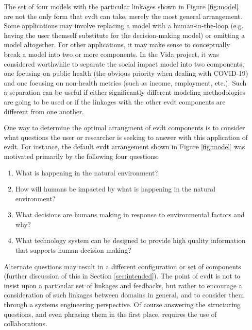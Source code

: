 The set of four models with the particular linkages shown in Figure \ref{fig:model} are not the only form that \ac{evdt} can take, merely the most general arrangement. Some applications may involve replacing a model with a human-in-the-loop (e.g. having the user themself substitute for the decision-making model) or omitting a model altogether. For other applications, it may make sense to conceptually break a model into two or more components. In the Vida project, it was considered worthwhile to separate the social impact model into two components, one focusing on public health (the obvious priority when dealing with COVID-19) and one focusing on non-health metrics (such as income, employment, etc.). Such a separation can be useful if either significantly different modeling methodologies are going to be used or if the linkages with the other \ac{evdt} components are different from one another. 

One way to determine the optimal arrangment of \ac{evdt} components is to consider what questions the user or researcher is seeking to answer with this application of \ac{evdt}. For instance, the default \ac{evdt} arrangement shown in Figure \ref{fig:model} was motivated primarily by the following four questions:

\begin{enumerate} \setlength{\itemsep}{0pt} \setlength{\parskip}{0pt}
    \item What is happening in the natural environment?
    \item How will humans be impacted by what is happening in the natural environment?
    \item What decisions are humans making in response to environmental factors and why?
    \item What technology system can be designed to provide high quality information that supports human decision making?
\end{enumerate}

Alternate questions may result in a different configuration or set of components (further discussion of this in Section \ref{sec:intended}). The point of \ac{evdt} is not to insist upon a particular set of linkages and feedbacks, but rather to encourage a consideration of such linkages between domains in general, and to consider them through a systems engineering perspective. Of course answering the structuring questions, and even phrasing them in the first place, requires the use of collaborations.

\subsection{} \label{sec:dss}

